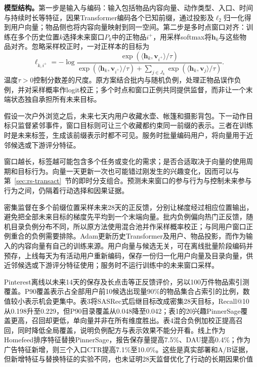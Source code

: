 \textbf{模型结构。}第一步是输入与编码：输入包括物品内容向量、动作类型、入口、时间与持续时长等特征，因果Transformer编码各个已知前缀，通过投影及$\ell_2$归一化得到用户向量；物品侧也将内容向量映射到同一空间。第二步是多时点窗口对齐：训练在多个历史位置$k$选择未来窗口$P_k$中的正物品$i^+$，用采样softmax将$\bm{h}_k$与这些物品对齐。忽略采样校正时，一对正样本的目标为
\begin{equation}
  \ell_{k,i^+}=-\log
  \frac{\exp(\langle\bm{h}_k,\bm{v}_{i^+}\rangle/\tau)}
  {\exp(\langle\bm{h}_k,\bm{v}_{i^+}\rangle/\tau)
    +\sum_{j\in J_k}\exp(\langle\bm{h}_k,\bm{v}_j\rangle/\tau)}.
  \label{eq:rs-pinnerformer-loss}
\end{equation}
温度$\tau>0$控制分数差的尺度。原方案结合批内与随机负例，处理正物品误作负例，并对采样概率作logit校正；多个时点和窗口正例共同提供监督，而非让一个末端状态独自承担所有未来目标。

假设一次户外浏览之后，未来七天内用户收藏水壶、帐篷和摄影背包。下一动作目标只监督紧邻事件，窗口目标则可让三个收藏都约束同一前缀的表示。三者在训练时是未来标签，生成该前缀表示时都不可见。服务时批量编码用户，将向量用于近邻候选或下游评分特征。

窗口越长，标签越可能包含多个任务或变化的需求；是否合适取决于向量的使用周期和目标行为。向量一天更新一次也可能错过刚发生的兴趣变化，因而可以与第~\ref{sec:rs-transact}~节的即时分支组合。预测未来窗口的参与行为与控制未来参与行为之间，仍隔着行动选择和因果证据。

密集监督在多个前缀位置采样未来28天的正反馈，分别让梯度经过相应位置输出，避免把全部未来目标的梯度先平均到一个末端向量。批内负例偏向热门正反馈，随机目录负例分布不同，所以原方法使用混合池并作采样概率校正；与同用户窗口正例重合的负例需要排除。Adam更新历史Transformer及用户、物品投影，而作为输入的内容向量有自己的训练来源。用户向量与候选无关，可在离线批量阶段编码并预存，上线每天为有活动用户重新编码，保存一份归一化用户向量及目录向量，供近邻候选或下游评分特征使用；服务时不运行训练中的未来窗口采样。

Pinterest离线以未来14天的保存及长点击等正反馈评价，另以100万件物品索引测覆盖。P90覆盖表示占全部用户前10候选出现量90\%的物品集合占索引的比例，数值较小表示机会更集中。表3将SASRec式后继目标改成密集28天目标，Recall@10从0.198升至0.229，但P90目录覆盖从0.048降至0.042；表1的20兴趣PinnerSage覆盖更高，召回却更低，单向量并非在所有维度胜出。表4混合负例加校正提高召回，同时降低全局覆盖，说明负例配方与表示效果不能分开看。线上作为Homefeed排序特征替换PinnerSage，报告保存量提高7.5\%、DAU提高0.4\%；作为广告特征新增，则三个入口CTR提高7.1\%至10.0\%。这些是真实部署和A/B证据，但新增特征与替换特征的实验不同，也未证明28天监督优化了行动的长期因果价值

